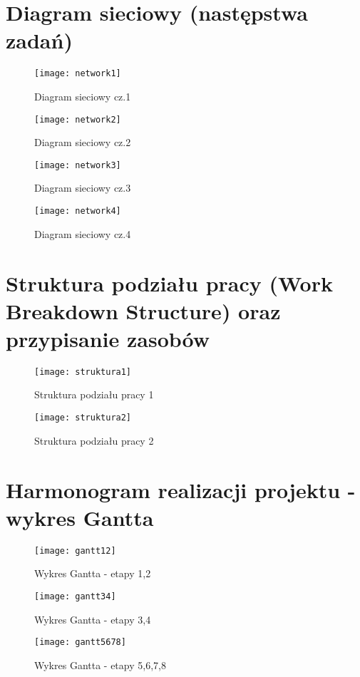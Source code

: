 \chapter{Diagram sieciowy (następstwa zadań)}
\begin{figure}[H]
\centering
  \texttt{[image: network1]}
  \caption{Diagram sieciowy cz.1}
  \label{struktura1}
\end{figure}
\begin{figure}[H]
\centering
  \texttt{[image: network2]}
  \caption{Diagram sieciowy cz.2}
  \label{struktura1}
\end{figure}
\begin{figure}[H]
\centering
  \texttt{[image: network3]}
  \caption{Diagram sieciowy cz.3 }
  \label{struktura1}
\end{figure}
\begin{figure}[H]
\centering
  \texttt{[image: network4]}
  \caption{Diagram sieciowy cz.4}
  \label{struktura1}
\end{figure}
\chapter{Struktura podziału pracy (Work Breakdown Structure) oraz przypisanie zasobów}
\begin{figure}[H]
\centering
  \texttt{[image: struktura1]}
  \caption{Struktura podziału pracy 1}
  \label{struktura1}
\end{figure}
\begin{figure}[H]
\centering
  \texttt{[image: struktura2]}
  \caption{Struktura podziału pracy 2}
  \label{struktura2}
\end{figure}
\chapter{Harmonogram realizacji projektu -  wykres Gantta}
\begin{figure}[H]
\centering
  \texttt{[image: gantt12]}
  \caption{Wykres Gantta - etapy 1,2}
  \label{gantt12}
\end{figure}
\begin{figure}[H]
\centering
  \texttt{[image: gantt34]}
  \caption{Wykres Gantta - etapy 3,4}
  \label{gantt34}
\end{figure}
\begin{figure}[H]
\centering
  \texttt{[image: gantt5678]}
  \caption{Wykres Gantta - etapy 5,6,7,8}
  \label{gantt5678}
\end{figure}
